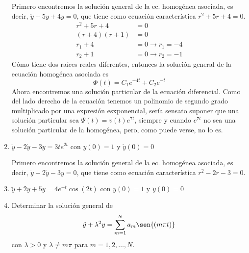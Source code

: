 \documentclass{article}
\begin{document}
\begin{enumerate}
{            \color{azul}
            Primero encontremos la solución general de la ec. homogénea asociada, es decir,
            $\ddot y+5\dot y+4y=0$, que tiene como ecuación característica $r^2+5r+4=0$.
            \begin{align*}
                r^2+5r+4 &= 0 \\
                (r+4)(r+1) &= 0 \\
                r_1+4 &= 0 \rightarrow r_1 = -4\\
                r_2+1 &= 0 \rightarrow r_2 = -1
            \end{align*}
            Cómo tiene dos raíces reales diferentes, entonces la solución general de la ecuación
            homogénea asociada es
            $$\Phi(t)=C_1e^{-4t}+C_2e^{-t}$$
            Ahora encontremos una solución particular de la ecuación diferencial. Como del lado
            derecho de la ecuación tenemos un polinomio de segundo grado multiplicado por una
            expresión esxponencial, sería sensato suponer que una solución particular sea
            $\Psi(t)=v(t)e^{7t}$, siempre y cuando $e^{7t}$ no sea una solución particular de la
            homogénea, pero, como puede verse, no lo es.
        }
        \item {
            $\ddot y-2\dot y-3y=3te^{2t}$ con $y(0)=1$ y $\dot y(0)=0$

            \color{azul}
            Primero encontremos la solución general de la ec. homogénea asociada, es decir,
            $\ddot y-2\dot y-3y=0$, que tiene como ecuación característica $r^2-2r-3=0$.


        }
        \item {
            $\ddot y+2\dot y+5y=4e^{-t}\cos{(2t)}$ con $y(0)=1$ y $\dot y(0)=0$

            \color{azul}
        }
        \item {
            Determinar la solución general de
            $$\ddot{y}+\lambda^2y=\sum_{m=1}^{N}{a_m\sen{(m\pi t)}}$$
            con $\lambda>0$ y $\lambda\neq m\pi$ para $m=1,2,\ldots,N$.

            \color{azul}
        }
    \end{enumerate}
\end{document}
